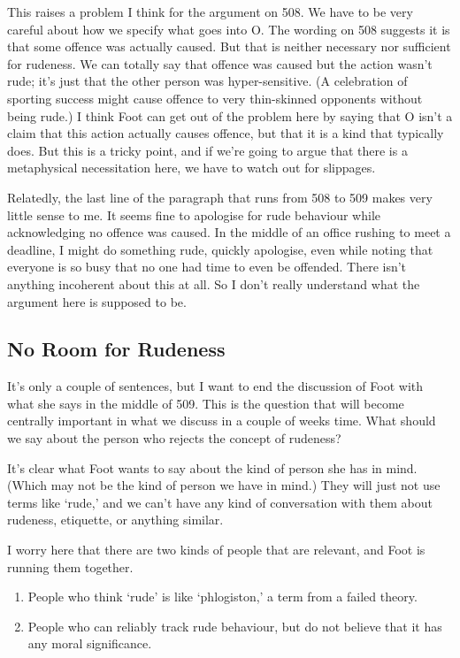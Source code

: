 \documentclass[
]{article}
\providecommand{\tightlist}{%
  \setlength{\itemsep}{0pt}\setlength{\parskip}{0pt}}
\begin{document}
This raises a problem I think for the argument on 508. We have to be
very careful about how we specify what goes into O. The wording on 508
suggests it is that some offence was actually caused. But that is
neither necessary nor sufficient for rudeness. We can totally say that
offence was caused but the action wasn't rude; it's just that the other
person was hyper-sensitive. (A celebration of sporting success might
cause offence to very thin-skinned opponents without being rude.) I
think Foot can get out of the problem here by saying that O isn't a
claim that this action actually causes offence, but that it is a kind
that typically does. But this is a tricky point, and if we're going to
argue that there is a metaphysical necessitation here, we have to watch
out for slippages.

Relatedly, the last line of the paragraph that runs from 508 to 509
makes very little sense to me. It seems fine to apologise for rude
behaviour while acknowledging no offence was caused. In the middle of an
office rushing to meet a deadline, I might do something rude, quickly
apologise, even while noting that everyone is so busy that no one had
time to even be offended. There isn't anything incoherent about this at
all. So I don't really understand what the argument here is supposed to
be.

\hypertarget{no-room-for-rudeness}{%
\subsection{No Room for Rudeness}\label{no-room-for-rudeness}}

It's only a couple of sentences, but I want to end the discussion of
Foot with what she says in the middle of 509. This is the question that
will become centrally important in what we discuss in a couple of weeks
time. What should we say about the person who rejects the concept of
rudeness?

It's clear what Foot wants to say about the kind of person she has in
mind. (Which may not be the kind of person we have in mind.) They will
just not use terms like `rude,' and we can't have any kind of
conversation with them about rudeness, etiquette, or anything similar.

I worry here that there are two kinds of people that are relevant, and
Foot is running them together.

\begin{enumerate}
\def\labelenumi{\arabic{enumi}.}
\tightlist
\item
  People who think `rude' is like `phlogiston,' a term from a failed
  theory.
\item
  People who can reliably track rude behaviour, but do not believe that
  it has any moral significance.
\end{enumerate}
\end{document}
